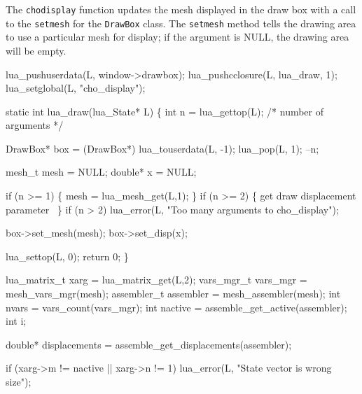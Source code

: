 \nwendcode{}\nwdocspar

The {\tt{}cho{}display} function updates the mesh displayed in the draw box
with a call to the {\tt{}set{}mesh} for the {\tt{}DrawBox} class.
The {\tt{}set{}mesh} method tells the drawing area to use a particular
mesh for display; if the argument is NULL, the drawing area will
be empty.

\nwenddocs{}\plusendmoddef
lua_pushuserdata(L, window->drawbox);
lua_pushcclosure(L, lua_draw, 1);
lua_setglobal(L, "cho_display");

\nwendcode{}\nwdocspar

\nwenddocs{}\plusendmoddef
static int lua_draw(lua_State* L)
\{
    int n = lua_gettop(L);  /* number of arguments */

    DrawBox* box = (DrawBox*) lua_touserdata(L, -1);
    lua_pop(L, 1);
    --n;

    mesh_t  mesh = NULL;
    double* x    = NULL;

    if (n >= 1) \{
        mesh = lua_mesh_get(L,1);
    \}
    if (n >= 2) \{
        \LA{}get draw displacement parameter~{\nwtagstyle{}}\RA{}
    \}
    if (n > 2)
        lua_error(L, "Too many arguments to cho_display");

    box->set_mesh(mesh);
    box->set_disp(x);

    lua_settop(L, 0);
    return 0;
\}

\nwendcode{}\nwdocspar

\nwenddocs{}\endmoddef
lua_matrix_t xarg      = lua_matrix_get(L,2);
vars_mgr_t   vars_mgr  = mesh_vars_mgr(mesh);
assembler_t  assembler = mesh_assembler(mesh);
int          nvars     = vars_count(vars_mgr);
int          nactive   = assemble_get_active(assembler);
int          i;

double*      displacements = assemble_get_displacements(assembler);

if (xarg->m != nactive || xarg->n != 1)
    lua_error(L, "State vector is wrong size");

